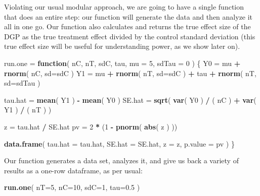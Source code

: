 \documentclass[
]{book}
\newenvironment{Shaded}{\begin{snugshade}}{\end{snugshade}}
\newcommand{\AttributeTok}[1]{\textcolor[rgb]{0.13,0.29,0.53}{#1}}
\newcommand{\ControlFlowTok}[1]{\textcolor[rgb]{0.13,0.29,0.53}{\textbf{#1}}}
\newcommand{\DecValTok}[1]{\textcolor[rgb]{0.00,0.00,0.81}{#1}}
\newcommand{\FloatTok}[1]{\textcolor[rgb]{0.00,0.00,0.81}{#1}}
\newcommand{\FunctionTok}[1]{\textcolor[rgb]{0.13,0.29,0.53}{\textbf{#1}}}
\newcommand{\NormalTok}[1]{#1}
\newcommand{\OtherTok}[1]{\textcolor[rgb]{0.56,0.35,0.01}{#1}}
\newcommand{\SpecialCharTok}[1]{\textcolor[rgb]{0.81,0.36,0.00}{\textbf{#1}}}
\begin{document}
Violating our usual modular approach, we are going to have a single function that does an entire step: our function will generate the data and then analyze it all in one go.
Our function also calculates and returns the true effect size of the DGP as the true treatment
effect divided by the control standard deviation (this true effect size will be useful for understanding power, as we show later on).

\begin{Shaded}
\begin{Highlighting}[]
\NormalTok{run.one }\OtherTok{=} \ControlFlowTok{function}\NormalTok{( nC, nT, sdC, tau, }\AttributeTok{mu =} \DecValTok{5}\NormalTok{, }\AttributeTok{sdTau =} \DecValTok{0}\NormalTok{ ) \{}
\NormalTok{  Y0 }\OtherTok{=}\NormalTok{ mu }\SpecialCharTok{+} \FunctionTok{rnorm}\NormalTok{( nC, }\AttributeTok{sd=}\NormalTok{sdC )}
\NormalTok{  Y1 }\OtherTok{=}\NormalTok{ mu }\SpecialCharTok{+} \FunctionTok{rnorm}\NormalTok{( nT, }\AttributeTok{sd=}\NormalTok{sdC ) }\SpecialCharTok{+}\NormalTok{ tau }\SpecialCharTok{+} \FunctionTok{rnorm}\NormalTok{( nT, }\AttributeTok{sd=}\NormalTok{sdTau )}

\NormalTok{  tau.hat }\OtherTok{=} \FunctionTok{mean}\NormalTok{( Y1 ) }\SpecialCharTok{{-}} \FunctionTok{mean}\NormalTok{( Y0 )}
\NormalTok{  SE.hat }\OtherTok{=} \FunctionTok{sqrt}\NormalTok{( }\FunctionTok{var}\NormalTok{( Y0 ) }\SpecialCharTok{/}\NormalTok{ ( nC ) }\SpecialCharTok{+} \FunctionTok{var}\NormalTok{( Y1 ) }\SpecialCharTok{/}\NormalTok{ ( nT ) )}

\NormalTok{  z }\OtherTok{=}\NormalTok{ tau.hat }\SpecialCharTok{/}\NormalTok{ SE.hat}
\NormalTok{  pv }\OtherTok{=} \DecValTok{2} \SpecialCharTok{*}\NormalTok{ (}\DecValTok{1} \SpecialCharTok{{-}} \FunctionTok{pnorm}\NormalTok{( }\FunctionTok{abs}\NormalTok{( z ) ))}

  \FunctionTok{data.frame}\NormalTok{( }\AttributeTok{tau.hat =}\NormalTok{ tau.hat, }\AttributeTok{SE.hat =}\NormalTok{ SE.hat, }
              \AttributeTok{z =}\NormalTok{ z, }\AttributeTok{p.value =}\NormalTok{ pv )}
\NormalTok{\}}
\end{Highlighting}
\end{Shaded}

Our function generates a data set, analyzes it, and give us back a variety
of results as a one-row dataframe, as per usual:

\begin{Shaded}
\begin{Highlighting}[]
\FunctionTok{run.one}\NormalTok{( }\AttributeTok{nT=}\DecValTok{5}\NormalTok{, }\AttributeTok{nC=}\DecValTok{10}\NormalTok{, }\AttributeTok{sdC=}\DecValTok{1}\NormalTok{, }\AttributeTok{tau=}\FloatTok{0.5}\NormalTok{ )}
\end{Highlighting}
\end{Shaded}
\end{document}
